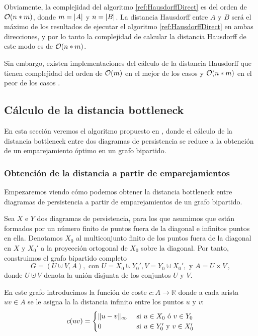 Obviamente, la complejidad del algoritmo \ref{ref:HausdorffDirect} es del orden de $\mathcal{O}(n*m)$, donde $m = \lvert A\rvert$ y $n = \lvert B\rvert$. La distancia Hausdorff entre $A$ y $B$  será el máximo de los resultados de ejecutar el algoritmo \ref{ref:HausdorffDirect} en ambas direcciones, y por lo tanto la complejidad de calcular la distancia Hausdorff de este modo es de $\mathcal{O}(n*m)$.

Sin embargo, existen implementaciones del cálculo de la distancia Hausdorff que tienen complejidad del orden de $\mathcal{O}(m)$ en el mejor de los casos y $\mathcal{O}(n*m)$ en el peor de los casos \cite{ArticuloHausdorff}.
\subsection{Cálculo de la distancia bottleneck}
En esta sección veremos el algoritmo propuesto en \cite[Chapter~8]{libroEH}, donde el cálculo de la distancia bottleneck entre dos diagramas de persistencia se reduce a la obtención de un emparejamiento óptimo en un grafo bipartido.

\subsubsection*{Obtención de la distancia a partir de emparejamientos}
Empezaremos viendo cómo podemos obtener la distancia bottleneck entre diagramas de persistencia a partir de emparejamientos de un grafo bipartido.

Sea $X$ e $Y$ dos diagramas de persistencia, para los que asumimos que están formados por un número finito de puntos fuera de la diagonal e infinitos puntos en ella. Denotamos $X_0$ al multiconjunto finito de los puntos fuera de la diagonal en $X$ y $X_0'$ a la proyección ortogonal de $X_0$ sobre la diagonal. Por tanto, construimos el grafo bipartido completo
\[
G= (U \cupdot V, A), \text{ con } U=X_0 \cupdot Y_0', V=Y_0 \cupdot X_0', \text{ y } A=U\times V\,,
\]
donde $U \cupdot V$ denota la unión disjunta de los conjuntos $U$ y $V$.

En este grafo introducimos la función de coste $c: A \to \mathbb{R}$ donde a cada arista $uv \in A$ se le asigna la la distancia infinito entre los puntos $u$ y $v$:
\[
c(uv)=
\begin{cases}
\lVert u-v\rVert_\infty & \text{ si } u \in X_0 \text{ ó } v \in Y_0   \\ 
0 & \text{ si } u \in Y_0' \text{ y } v \in X_0' 
\end{cases}
\]

